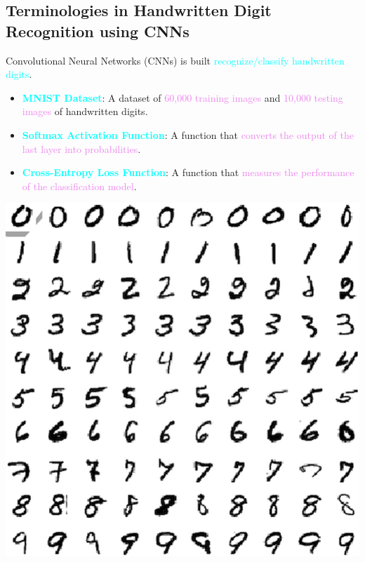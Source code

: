 \documentclass{book}
\begin{document}
\subsection{Terminologies in Handwritten Digit Recognition using CNNs}
Convolutional Neural Networks (CNNs) is built \textcolor{cyan}{recognize/classify handwritten digits}.
\begin{itemize}
    \item \textcolor{cyan}{\textbf{MNIST Dataset}}: A dataset of \textcolor{violet}{60,000 training images} and \textcolor{violet}{10,000 testing images} of handwritten digits.
    \item \textcolor{cyan}{\textbf{Softmax Activation Function}}: A function that \textcolor{violet}{converts the output of the last layer into probabilities}.
    \item \textcolor{cyan}{\textbf{Cross-Entropy Loss Function}}: A function that \textcolor{violet}{measures the performance of the classification model}.
\end{itemize}
\begin{center}
    \includegraphics[scale=0.27]{chapter 7/ch7_figure12.jpeg}
\end{center}
\end{document}
